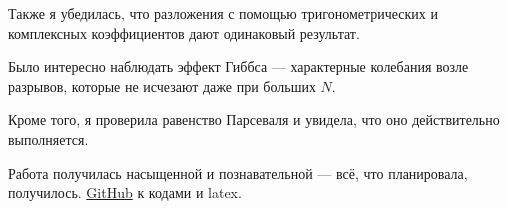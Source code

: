 \documentclass[a4paper,12pt]{article}
\begin{document}
Также я убедилась, что разложения с помощью тригонометрических и комплексных коэффициентов дают одинаковый результат.

Было интересно наблюдать эффект Гиббса — характерные колебания возле разрывов, которые не исчезают даже при больших \( N \).

Кроме того, я проверила равенство Парсеваля и увидела, что оно действительно выполняется.

Работа получилась насыщенной и познавательной — всё, что планировала, получилось. \href{http://github.com/decadeos/ITMO/tree/master/2_course/chMetods/lab1}{GitHub} к кодами и latex.
\end{document}

